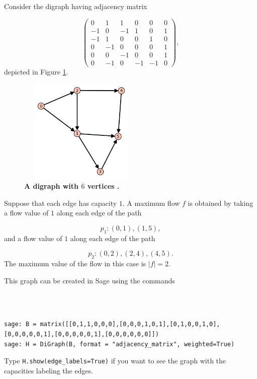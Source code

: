 \begin{example}
{\rm
Consider the digraph having adjacency matrix

\[
\left(\begin{array}{cccccc}
0 & 1 & 1 & 0 & 0 & 0 \\
-1 & 0 & -1 & 1 & 0 & 1 \\
-1 & 1 & 0 & 0 & 1 & 0 \\
0 & -1 & 0 & 0 & 0 & 1 \\
0 & 0 & -1 & 0 & 0 & 1 \\
0 & -1 & 0 & -1 & -1 & 0
\end{array}\right),
\]
depicted in Figure \ref{fig:digraph-flow1}.

\begin{figure}[H]
\begin{center}
\includegraphics[height=5cm,width=6cm]{image/digraph-flow}
\end{center}
\caption{{\bf A digraph with $6$ vertices .} }
\label{fig:digraph-flow1}
\end{figure}
Suppose that each edge has capacity $1$.
A maximum flow $f$ is obtained by taking a flow value
of $1$ along each edge of the path 

\[
p_1:(0,1),(1,5),
\]
and a flow value
of $1$ along each edge of the path 

\[
p_2:(0,2),(2,4),(4,5).
\]
The maximum value of the flow in this case is $|f|=2$.

This graph can be created in Sage using the commands

%
\begin{center}
\fontsize{9pt}{9pt}
\selectfont
\tt
\begin{lstlisting}

sage: B = matrix([[0,1,1,0,0,0],[0,0,0,1,0,1],[0,1,0,0,1,0],[0,0,0,0,0,1],[0,0,0,0,0,1],[0,0,0,0,0,0]])
sage: H = DiGraph(B, format = "adjacency_matrix", weighted=True)

\end{lstlisting}
\end{center}
%

\noindent
Type {\tt H.show(edge\_labels=True)} if you want to see the graph with
the capacities labeling the edges.


}
\end{example}


